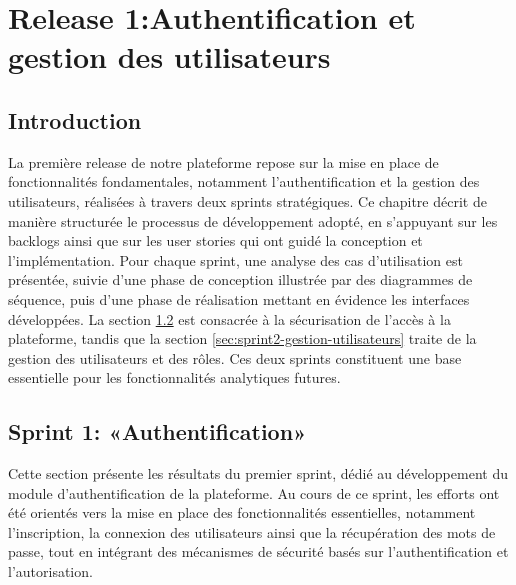 \chapter{Release 1:Authentification et gestion des utilisateurs} 
 \minitoc
 \newpage
\section{Introduction}
La première release de notre plateforme repose sur la mise en place de fonctionnalités fondamentales, notamment l’authentification et la gestion des utilisateurs, réalisées à travers deux sprints stratégiques.
Ce chapitre décrit de manière structurée le processus de développement adopté, en s’appuyant sur les backlogs ainsi que sur les user stories qui ont guidé la conception et l’implémentation.
Pour chaque sprint, une analyse des cas d’utilisation est présentée, suivie d’une phase de conception illustrée par des diagrammes de séquence, puis d’une phase de réalisation mettant en évidence les interfaces développées.
La section \ref{sec:sprint1-authentification} est consacrée à la sécurisation de l’accès à la plateforme, tandis que la section \ref{sec:sprint2-gestion-utilisateurs} traite de la gestion des utilisateurs et des rôles. Ces deux sprints constituent une base essentielle pour les fonctionnalités analytiques futures.

  \section{Sprint 1: «Authentification»}
  \label{sec:sprint1-authentification}
  Cette section présente les résultats du premier sprint, dédié au développement du module d’authentification de la plateforme. Au cours de ce sprint, les efforts ont été orientés vers la mise en place des fonctionnalités essentielles, notamment l’inscription, la connexion des utilisateurs ainsi que la récupération des mots de passe, tout en intégrant des mécanismes de sécurité basés sur l’authentification et l’autorisation.
